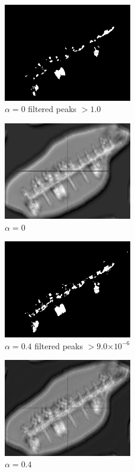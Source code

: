 \documentclass[12pt]{article}
\providecommand{\e}[1]{\ensuremath{\times 10^{#1}}}
\begin{document}
\begin{figure}
\centering
\includegraphics[width=0.50\textwidth]{boats_a00_peak1.png}
\caption{\(\alpha=0\) filtered peaks \(> 1.0\)}
\label{a00peak}
\end{figure}

\begin{figure}
\centering
\includegraphics[width=0.50\textwidth]{boats_a00.png}
\caption{\(\alpha=0\)}
\label{a00}
\end{figure}

\begin{figure}
\centering
\includegraphics[width=0.50\textwidth]{boats_a04_peak9e-6.png}
\caption{\(\alpha=0.4\) filtered peaks \(> 9.0\e{-6}\)}
\label{a04peak}
\end{figure}

\begin{figure}
\centering
\includegraphics[width=0.50\textwidth]{boats_a04.png}
\caption{\(\alpha=0.4\)}
\label{a04}
\end{figure}
\end{document}
